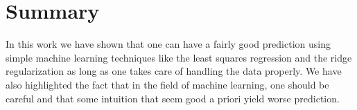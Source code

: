 \documentclass[10pt,conference,compsocconf]{IEEEtran}
\begin{document}

\section{Summary}
In this work we have shown that one can have a fairly good prediction using simple machine learning techniques like the least squares regression and the ridge regularization as long as one takes care of handling the data properly. We have also highlighted the fact that in the field of machine learning, one should be careful and that some intuition that seem good a priori yield worse prediction.%

\end{document}
